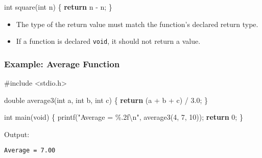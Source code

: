 \documentclass[
  letterpaper,
  DIV=11,
  numbers=noendperiod]{scrreprt}
\newenvironment{Shaded}{\begin{snugshade}}{\end{snugshade}}
\newcommand{\ControlFlowTok}[1]{\textcolor[rgb]{0.00,0.23,0.31}{\textbf{#1}}}
\newcommand{\DataTypeTok}[1]{\textcolor[rgb]{0.68,0.00,0.00}{#1}}
\newcommand{\DecValTok}[1]{\textcolor[rgb]{0.68,0.00,0.00}{#1}}
\newcommand{\FloatTok}[1]{\textcolor[rgb]{0.68,0.00,0.00}{#1}}
\newcommand{\ImportTok}[1]{\textcolor[rgb]{0.00,0.46,0.62}{#1}}
\newcommand{\NormalTok}[1]{\textcolor[rgb]{0.00,0.23,0.31}{#1}}
\newcommand{\OperatorTok}[1]{\textcolor[rgb]{0.37,0.37,0.37}{#1}}
\newcommand{\PreprocessorTok}[1]{\textcolor[rgb]{0.68,0.00,0.00}{#1}}
\newcommand{\SpecialCharTok}[1]{\textcolor[rgb]{0.37,0.37,0.37}{#1}}
\newcommand{\StringTok}[1]{\textcolor[rgb]{0.13,0.47,0.30}{#1}}
\providecommand{\tightlist}{%
  \setlength{\itemsep}{0pt}\setlength{\parskip}{0pt}}
\begin{document}
\begin{Shaded}
\begin{Highlighting}[]
\DataTypeTok{int}\NormalTok{ square}\OperatorTok{(}\DataTypeTok{int}\NormalTok{ n}\OperatorTok{)} \OperatorTok{\{}
    \ControlFlowTok{return}\NormalTok{ n }\OperatorTok{{-}}\NormalTok{ n}\OperatorTok{;}
\OperatorTok{\}}
\end{Highlighting}
\end{Shaded}

\begin{itemize}
\tightlist
\item
  The type of the return value must match the function's declared return
  type.
\item
  If a function is declared \texttt{void}, it should not return a value.
\end{itemize}

\subsubsection{Example: Average
Function}\label{example-average-function}

\begin{Shaded}
\begin{Highlighting}[]
\PreprocessorTok{\#include }\ImportTok{\textless{}stdio.h\textgreater{}}

\DataTypeTok{double}\NormalTok{ average3}\OperatorTok{(}\DataTypeTok{int}\NormalTok{ a}\OperatorTok{,} \DataTypeTok{int}\NormalTok{ b}\OperatorTok{,} \DataTypeTok{int}\NormalTok{ c}\OperatorTok{)} \OperatorTok{\{}
    \ControlFlowTok{return} \OperatorTok{(}\NormalTok{a }\OperatorTok{+}\NormalTok{ b }\OperatorTok{+}\NormalTok{ c}\OperatorTok{)} \OperatorTok{/} \FloatTok{3.0}\OperatorTok{;}
\OperatorTok{\}}

\DataTypeTok{int}\NormalTok{ main}\OperatorTok{(}\DataTypeTok{void}\OperatorTok{)} \OperatorTok{\{}
\NormalTok{    printf}\OperatorTok{(}\StringTok{"Average = }\SpecialCharTok{\%.2f\textbackslash{}n}\StringTok{"}\OperatorTok{,}\NormalTok{ average3}\OperatorTok{(}\DecValTok{4}\OperatorTok{,} \DecValTok{7}\OperatorTok{,} \DecValTok{10}\OperatorTok{));}
    \ControlFlowTok{return} \DecValTok{0}\OperatorTok{;}
\OperatorTok{\}}
\end{Highlighting}
\end{Shaded}

Output:

\begin{verbatim}
Average = 7.00
\end{verbatim}
\end{document}
